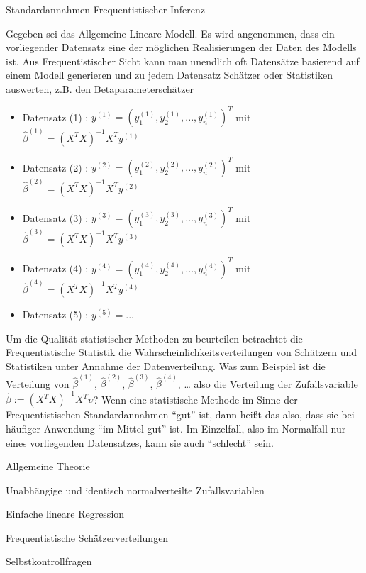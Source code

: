 \documentclass[
  8pt,
  ignorenonframetext,
]{beamer}
\begin{document}
\begin{frame}{}
\protect\hypertarget{section-6}{}
\small

Standardannahmen Frequentistischer Inferenz

\footnotesize
{}

Gegeben sei das Allgemeine Lineare Modell. Es wird angenommen, dass ein
vorliegender Datensatz eine der möglichen Realisierungen der Daten des
Modells ist. Aus Frequentistischer Sicht kann man unendlich oft
Datensätze basierend auf einem Modell generieren und zu jedem Datensatz
Schätzer oder Statistiken auswerten, z.B. den Betaparameterschätzer
\vspace{1mm}

\begin{itemize}
\item[] Datensatz (1) : $y^{(1)} = \left(y_1^{(1)}, y_2^{(1)}, ...,y_n^{(1)}\right)^T$  mit $\hat{\beta}^{(1)} = (X^TX)^{-1}X^Ty^{(1)}$
\item[] Datensatz (2) : $y^{(2)} = \left(y_1^{(2)}, y_2^{(2)}, ...,y_n^{(2)}\right)^T$  mit $\hat{\beta}^{(2)} = (X^TX)^{-1}X^Ty^{(2)}$
\item[] Datensatz (3) : $y^{(3)} = \left(y_1^{(3)}, y_2^{(3)}, ...,y_n^{(3)}\right)^T$  mit $\hat{\beta}^{(3)} = (X^TX)^{-1}X^Ty^{(3)}$
\item[] Datensatz (4) : $y^{(4)} = \left(y_1^{(4)}, y_2^{(4)}, ...,y_n^{(4)}\right)^T$  mit $\hat{\beta}^{(4)} = (X^TX)^{-1}X^Ty^{(4)}$
\item[] Datensatz (5) : $y^{(5)} = ...$
\end{itemize}

\vspace{1mm}

Um die Qualität statistischer Methoden zu beurteilen betrachtet die
Frequentistische Statistik die Wahrscheinlichkeitsverteilungen von
Schätzern und Statistiken unter Annahme der Datenverteilung. Was zum
Beispiel ist die Verteilung von \(\hat{\beta}^{(1)}\),
\(\hat{\beta}^{(2)}\), \(\hat{\beta}^{(3)}\), \(\hat{\beta}^{(4)}\),
\ldots{} also die Verteilung der Zufallsvariable
\(\hat{\beta} := (X^TX)^{-1}X^T\upsilon\)? Wenn eine statistische
Methode im Sinne der Frequentistischen Standardannahmen ``gut'' ist,
dann heißt das also, dass sie bei häufiger Anwendung ``im Mittel gut''
ist. Im Einzelfall, also im Normalfall nur eines vorliegenden
Datensatzes, kann sie auch ``schlecht'' sein.
\end{frame}

\begin{frame}{}
\protect\hypertarget{section-7}{}
\large
{}
\vfill

Allgemeine Theorie

Unabhängige und identisch normalverteilte Zufallsvariablen

Einfache lineare Regression

Frequentistische Schätzerverteilungen

Selbstkontrollfragen \vfill
\end{frame}
\end{document}
